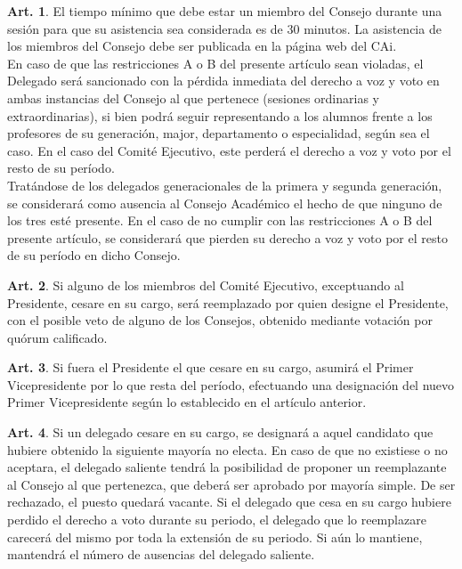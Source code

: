 \documentclass[letterpaper,11pt]{article}
\theoremstyle{definition}%
\newtheorem{art}{Art.} %
\begin{document}
\begin{art}
	El tiempo mínimo que debe estar un miembro del Consejo durante una sesión para que su asistencia sea considerada es de 30 minutos. La asistencia de los miembros del Consejo debe ser publicada en la página web del CAi.\\
	En caso de que las restricciones A o B del presente artículo sean violadas, el Delegado será sancionado con la pérdida inmediata del derecho a voz y voto en ambas instancias del Consejo al que pertenece (sesiones ordinarias y extraordinarias), si bien podrá seguir representando a los alumnos frente a los profesores de su generación, major, departamento o especialidad, según sea el caso. En el caso del Comité Ejecutivo, este perderá el derecho a voz y voto por el resto de su período.\\
	Tratándose de los delegados generacionales de la primera y segunda generación, se considerará como ausencia al Consejo Académico el hecho de que ninguno de los tres esté presente. En el caso de no cumplir con las restricciones A o B del presente artículo, se considerará que pierden su derecho a voz y voto por el resto de su período en dicho Consejo.
\end{art}

\begin{art}\label{ceseCargoEjecutivo}
	Si alguno de los miembros del Comité Ejecutivo, exceptuando al Presidente, cesare en su cargo, será reemplazado por quien designe el Presidente, con el posible veto de alguno de los Consejos, obtenido mediante votación por quórum calificado.
\end{art}

\begin{art}\label{ceseCargoPresidente}
	Si fuera el Presidente el que cesare en su cargo, asumirá el Primer Vicepresidente por lo que resta del período, efectuando una designación del nuevo Primer Vicepresidente según lo establecido en el artículo anterior.
\end{art}

\begin{art}\label{reemplazoDelegados}
	Si un delegado cesare en su cargo, se designará a aquel candidato que hubiere obtenido la siguiente mayoría no electa. En caso de que no existiese o no aceptara, el delegado saliente tendrá la posibilidad de proponer un reemplazante al Consejo al que pertenezca, que deberá ser aprobado por mayoría simple. De ser rechazado, el puesto quedará vacante. Si el delegado que cesa en su cargo hubiere perdido el derecho a voto durante su periodo, el delegado que lo reemplazare carecerá del mismo por toda la extensión de su periodo. Si aún lo mantiene, mantendrá el número de ausencias del delegado saliente.
\end{art}
\end{document}
